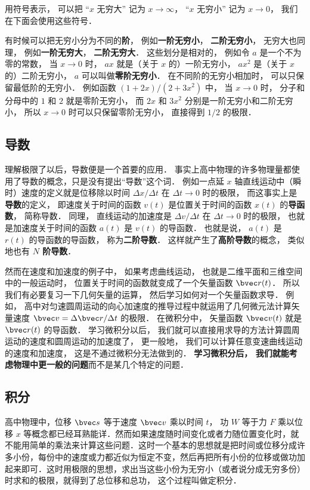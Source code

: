 用符号表示， 可以把 “$x$ 无穷大” 记为 $x \to \infty$， “$x$ 无穷小” 记为 $x \to 0$， 我们在下面会使用这些符号．

有时候可以把无穷小分为不同的\textbf{阶}， 例如\textbf{一阶无穷小}， \textbf{二阶无穷小}， 无穷大也同理， 例如\textbf{一阶无穷大}， \textbf{二阶无穷大}． 这些划分是相对的， 例如令 $a$ 是一个不为零的常数， 当 $x \to 0$ 时， $a x$ 就是（关于 $x$ 的）一阶无穷小， $a x^2$ 是（关于 $x$ 的）二阶无穷小， $a$ 可以叫做\textbf{零阶无穷小}． 在不同阶的无穷小相加时， 可以只保留最低阶的无穷小． 例如函数 $(1+2x)/(2+3x^2)$ 中， 当 $x\to 0$ 时， 分子和分母中的 $1$ 和 $2$ 就是零阶无穷小， 而 $2x$ 和 $3x^2$ 分别是一阶无穷小和二阶无穷小， 所以 $x\to 0$ 时可以只保留零阶无穷小， 直接得到 $1/2$ 的极限．

\subsection{导数}
理解极限了以后，导数便是一个首要的应用． 事实上高中物理的许多物理量都使用了导数的概念，只是没有提出“导数”这个词． 例如一点延 $x$ 轴直线运动中（瞬时）速度的定义就是位移除以时间 $\Delta x/\Delta t$ 在 $\Delta t \to 0$ 时的极限， 而这事实上是\textbf{导数}的定义， 即速度关于时间的函数 $v(t)$ 是位置关于时间的函数 $x(t)$ 的\textbf{导函数}， 简称导数． 同理， 直线运动的加速度是 $\Delta v/\Delta t$ 在 $\Delta t \to 0$ 时的极限， 也就是加速度关于时间的函数 $a(t)$ 是 $v(t)$ 的导函数． 也就是说， $a(t)$ 是 $r(t)$ 的导函数的导函数， 称为\textbf{二阶导数}． 这样就产生了\textbf{高阶导数}的概念， 类似地也有 \textbf{$N$ 阶导数}．

然而在速度和加速度的例子中， 如果考虑曲线运动， 也就是二维平面和三维空间中的一般运动时， 位置关于时间的函数就变成了一个矢量函数 $\bvec r(t)$． 所以我们有必要复习一下几何矢量的运算， 然后学习如何对一个矢量函数求导． 例如， 高中对匀速圆周运动的向心加速度的推导过程中就运用了几何微元法计算矢量速度 $\bvec v = \Delta \bvec r/\Delta t$ 的极限． 在微积分中， 矢量函数 $\bvec v(t)$ 就是 $\bvec r(t)$ 的导函数． 学习微积分以后， 我们就可以直接用求导的方法计算圆周运动的速度和圆周运动的加速度了， 更一般地， 我们可以计算任意变速曲线运动的速度和加速度， 这是不通过微积分无法做到的． \textbf{学习微积分后， 我们就能考虑物理中更一般的问题}而不是某几个特定的问题．


\subsection{积分}
高中物理中，位移 $\bvec s$ 等于速度 $\bvec v$ 乘以时间 $t$， 功 $W$ 等于力 $F$ 乘以位移 $x$ 等概念都已经耳熟能详．然而如果速度随时间变化或者力随位置变化时，就不能用简单的乘法来计算这些问题．这时一个基本的思想就是把时间或位移分成许多小份，每份中的速度或力都近似为恒定不变，然后再把所有小份的位移或做功加起来即可．这时用极限的思想，求出当这些小份为无穷小（或者说分成无穷多份）时求和的极限，就得到了总位移和总功， 这个过程叫做定积分． %

